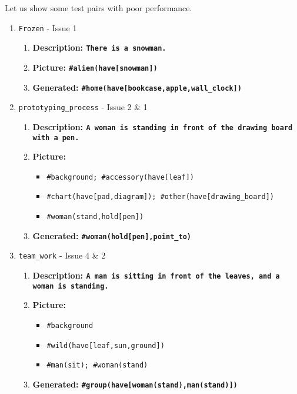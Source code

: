 \documentclass{article} %
\begin{document}
Let us show some test pairs with poor performance.
\begin{enumerate}
	
	\item \verb|Frozen| - Issue 1
	\begin{enumerate}
		\item \bf{Description}: \verb|There is a snowman.|
		\item \bf{Picture}: \verb|#alien(have[snowman])|
		\item \bf{Generated}: \verb|#home(have[bookcase,apple,wall_clock])|
	\end{enumerate}
	
	\item \verb|prototyping_process| - Issue 2 \& 1
	\begin{enumerate}
		\item \bf{Description}: \verb|A woman is standing in front of the drawing board with a pen.|
		\item \bf{Picture}: 
		\begin{itemize}
			\item \verb|#background; #accessory(have[leaf])|
			\item \verb|#chart(have[pad,diagram]); #other(have[drawing_board])|
			\item \verb|#woman(stand,hold[pen])|
		\end{itemize}
		\item \bf{Generated}: \verb|#woman(hold[pen],point_to)|
	\end{enumerate}

	\item \verb|team_work| - Issue 4 \& 2
	\begin{enumerate}
		\item \bf{Description}: \verb|A man is sitting in front of the leaves, and a woman is standing.|
		\item \bf{Picture}: 
		\begin{itemize}
			\item \verb|#background|
			\item \verb|#wild(have[leaf,sun,ground])|
			\item \verb|#man(sit); #woman(stand)|
		\end{itemize}
		\item \bf{Generated}: \verb|#group(have[woman(stand),man(stand)])|
	\end{enumerate}


\end{enumerate}
\end{document}

